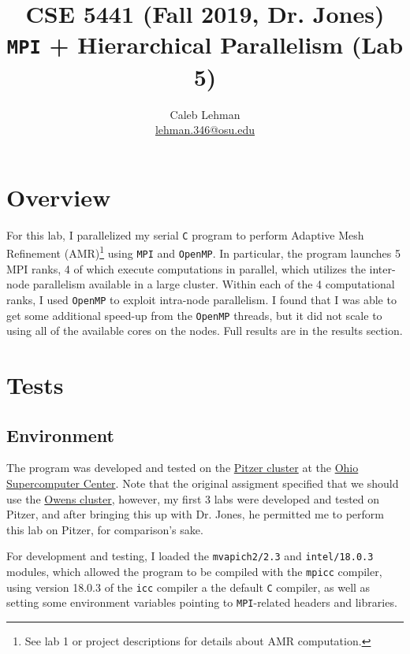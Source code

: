 \documentclass{article}
\title{\vspace{-4em}
CSE 5441 (Fall 2019, Dr. Jones)\\
\large \texttt{MPI} + Hierarchical Parallelism (Lab 5)
}
\author{
Caleb Lehman \\
\href{mailto:lehman.346@osu.edu}{lehman.346@osu.edu}
}
\date{}
\begin{document}
\maketitle

\section*{Overview}
\label{sec:overview}

For this lab, I parallelized my serial \texttt{C} program to perform Adaptive
Mesh Refinement (AMR)\footnote{See lab 1 or project descriptions for details
about AMR computation.} using \texttt{MPI} and \texttt{OpenMP}. In particular,
the program launches 5 MPI ranks, 4 of which execute computations in parallel,
which utilizes the inter-node parallelism available in a large cluster. Within
each of the 4 computational ranks, I used \texttt{OpenMP} to exploit intra-node
parallelism. I found that I was able to get some additional speed-up from the
\texttt{OpenMP} threads, but it did not scale to using all of the available cores
on the nodes. Full results are in the results section.

\section*{Tests}
\label{sec:tests}

\subsection*{Environment}
\label{subsec:environment}

The program was developed and tested on the
\href{https://www.osc.edu/resources/technical_support/supercomputers/pitzer}{Pitzer
cluster} at the \href{https://www.osc.edu/}{Ohio Supercomputer Center}. Note that
the original assigment specified that we should use the
\href{https://www.osc.edu/resources/technical_support/supercomputers/owens}{Owens
cluster}, however, my first 3 labs were developed and tested on Pitzer, and after
bringing this up with Dr. Jones, he permitted me to perform this lab on Pitzer,
for comparison's sake.

For development and testing, I loaded the \texttt{mvapich2/2.3} and \texttt{intel/18.0.3} modules, which
allowed the program to be compiled with the \texttt{mpicc} compiler, using version 18.0.3 of the \texttt{icc}
compiler a the default \texttt{C} compiler, as well as setting some environment variables pointing to
\texttt{MPI}-related headers and libraries.
\end{document}
